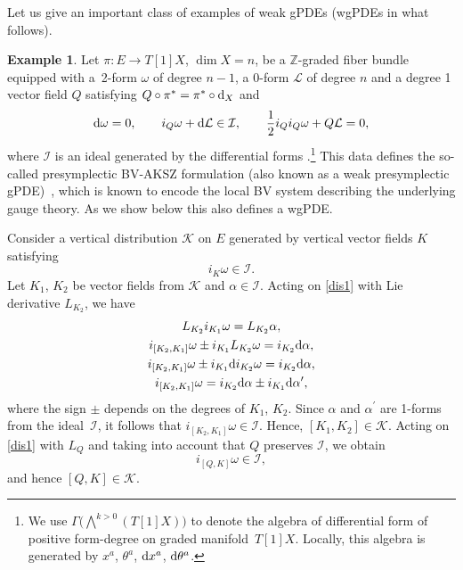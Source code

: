 \documentclass[10pt,a4paper]{amsart}
\numberwithin{equation}{section}
\theoremstyle{definition}
\newtheorem{Example}[Theorem]{Example}
\newcommand{\changed}[1]{{#1}}
\begin{document}
Let us give an important class of examples of weak gPDEs (wgPDEs in what follows).

\begin{Example} \label{ex:presymp}
 Let $\pi\colon E\rightarrow T[1]X$, $\dim{X}=n$, be a $\mathbb{Z}$-graded fiber bundle equipped with a~2-form $\omega$ of degree $n-1$, a 0-form $\mathcal{L}$ of degree $n$ and a degree 1 vector field $Q$ satisfying $Q\circ\pi^*=\pi^*\circ {\rm d}_X$ and
 \begin{equation*}%
 {\rm d}\omega=0,\qquad i_Q\omega+{\rm d}\mathcal{L}\in \mathcal{I},\qquad \frac{1}{2}i_Qi_Q\omega+Q\mathcal{L}=0,
 \end{equation*}
 where $\mathcal{I}$ is an ideal generated by the differential forms .\footnote{\changed{We use $\Gamma\bigl(\bigwedge^{k>0}(T[1]X)\bigr)$ to denote the algebra of differential form of positive form-degree on graded manifold~$T[1]X$. Locally, this algebra is generated by $x^a$, $\theta^a$, ${\rm d}x^a$, ${\rm d}\theta^a$.}} This data defines the so-called presymplectic BV-AKSZ formulation (also known as a weak presymplectic gPDE)~\cite{Dneprov:2024cvt, Grigoriev:2022zlq}, which is known to encode the local BV system describing the underlying gauge theory. As we show below this also defines a wgPDE.

 Consider a vertical distribution $\mathcal{K}$ on $E$ generated by vertical vector fields $K$ satisfying
 \begin{equation}\label{dis1}
 i_K\omega\in\mathcal{I}.
 \end{equation}
 Let $K_1$, $K_2$ be vector fields from $\mathcal{K}$ and $\alpha\in\mathcal{I}$. Acting on \eqref{dis1} with Lie derivative $L_{K_2}$, we have
 \begin{gather*}
 L_{K_2}i_{K_1}\omega=L_{K_2}\alpha,\\
 i_{[K_2,K_1]}\omega\pm i_{K_1}L_{K_2}\omega=i_{K_2}{\rm d}\alpha,\\
 i_{[K_2,K_1]}\omega\pm i_{K_1}{\rm d}i_{K_2}\omega=i_{K_2}{\rm d}\alpha,\\
 i_{[K_2,K_1]}\omega=i_{K_2}{\rm d}\alpha\pm i_{K_1}{\rm d}\alpha^{\prime},
 \end{gather*}
 where the sign $\pm$ depends on the degrees of $K_1$, $K_2$. Since $\alpha$ and $\alpha^{\prime}$ are 1-forms from the ideal~$\mathcal{I}$, it follows that $i_{[K_2,K_1]}\omega\in \mathcal{I}$. Hence, $[K_1,K_2]\in \mathcal{K}$. Acting on \eqref{dis1} with $L_Q$ and taking into account that $Q$ preserves $\mathcal{I}$, we obtain
 \begin{equation*}
 i_{[Q,K]}\omega\in\mathcal{I},
 \end{equation*}
 and hence $[Q,K]\in \mathcal{K}$.


\end{Example}
\end{document}
